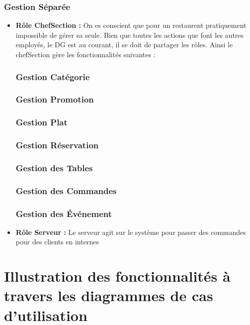 \subsubsection{Gestion Séparée}
\begin{itemize}
    \item \textbf{Rôle ChefSection :} On es conscient que pour un restaurent pratiquement impossible de gérer sa seule. Bien que toutes les actions que font les autres employés, le DG est au courant, il se doit de partager les rôles. Ainsi le chefSection gère les fonctionnalités suivantes : 
    \subsubsection{Gestion Catégorie}
    \subsubsection{Gestion Promotion}
    \subsubsection{Gestion Plat}
    \subsubsection{Gestion Réservation}
    \subsubsection{Gestion des Tables}
    \subsubsection{Gestion des Commandes}
    \subsubsection{Gestion des Événement}
    
    \item \textbf{Rôle Serveur : } Le serveur agit sur le système pour passer des commandes pour des clients en internes
\end{itemize}


\section{Illustration des fonctionnalités à travers les diagrammes de cas d'utilisation}


